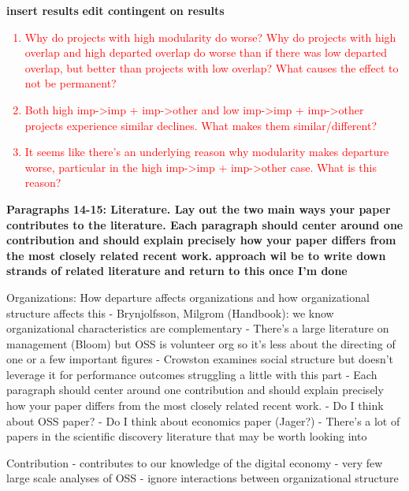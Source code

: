 \documentclass[12pt,notitlepage]{article}
\begin{document}
\textbf{insert results}
\textbf{edit contingent on results}
\textcolor{red}{
\begin{enumerate}
    \item Why do projects with high modularity do worse? Why do projects with high overlap and high departed overlap do worse than if there was low departed overlap, but better than projects with low overlap? What causes the effect to not be permanent?
    \item Both high imp->imp + imp->other and low imp->imp + imp->other projects experience similar declines. What makes them similar/different?
    \item It seems like there's an underlying reason why modularity makes departure worse, particular in the high imp->imp + imp->other case. What is this reason?
\end{enumerate}
}
\textbf{Paragraphs 14-15: Literature. Lay out the two main ways your paper contributes to the literature. Each paragraph should center around one contribution and should explain precisely how your paper differs from the most closely related recent work.}
\textbf{approach wil be to write down strands of related literature and return to this once I'm done }

Organizations: How departure affects organizations and how organizational structure affects this
- Brynjolfsson, Milgrom (Handbook): we know organizational characteristics are complementary
- There's a large literature on management (Bloom) but OSS is volunteer org so it's less about the directing of one or a few important figures
- Crowston examines social structure but doesn't leverage it for performance outcomes
struggling a little with this part
- Each paragraph should center around one contribution and should explain precisely how your paper differs from the most closely related recent work.
  - Do I think about OSS paper?
  - Do I think about economics paper (Jager?)
  - There's a lot of papers in the scientific discovery literature that may be worth looking into


Contribution - contributes to our knowledge of the digital economy
- very few large scale analyses of OSS
- ignore interactions between organizational structure

\end{document}
